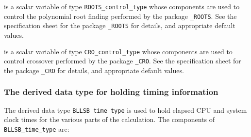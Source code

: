 \documentclass{galahad}
\newcommand{\packagename}{BLLSB}
\begin{document}
\begin{description}
 is a scalar variable of type
{\tt ROOTS\_control\_type}
whose components are used to control the polynomial root finding
performed by the package
{\tt \libraryname\_ROOTS}.
See the specification sheet for the package
{\tt \libraryname\_ROOTS}
for details, and appropriate default values.

 is a scalar variable of type
{\tt CRO\_control\_type}
whose components are used to control crossover
performed by the package
{\tt \libraryname\_CRO}.
See the specification sheet for the package
{\tt \libraryname\_CRO}
for details, and appropriate default values.

\end{description}


\subsubsection{The derived data type for holding timing
 information}\label{typetime}
The derived data type
{\tt \packagename\_time\_type}
is used to hold elapsed CPU and system clock times for the various parts of
the calculation. The components of
{\tt \packagename\_time\_type}
are:
\end{document}
